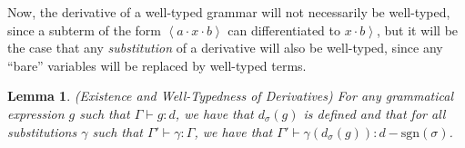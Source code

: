 \documentclass{article}
\newcommand{\lft}[1]{\left<{#1}\right.}
\newcommand{\rgt}[1]{\left.{#1}\right>}
\newcommand{\judgebalance}[3][\Gamma]{{#1} \vdash {#2} : {#3}}
\newcommand{\judgesubst}[3]{{#1} \vdash {#2} : {#3}}
\newcommand{\deriv}[2]{d_{#1}({#2})}
\newtheorem{lemma}{Lemma}
\begin{document}
Now, the derivative of a well-typed grammar will not necessarily be
well-typed, since a subterm of the form $\lft{a}\cdot x \cdot\rgt{b}$ can
differentiated to $x\cdot\rgt{b}$, but it will be the case that any
\emph{substitution} of a derivative will also be well-typed, since
any ``bare'' variables will be replaced by well-typed terms. 

\begin{lemma}{(Existence and Well-Typedness of Derivatives)}
For any grammatical expression $g$ such that $\judgebalance{g}{d}$, 
we have that $\deriv{\sigma}{g}$ is defined and that for all 
substitutions $\gamma$ such that $\judgesubst{\Gamma'}{\gamma}{\Gamma}$, 
we have that $\judgebalance[\Gamma']{\gamma(\deriv{\sigma}{g})}{d - \mathrm{sgn}(\sigma)}$.
\end{lemma}
\end{document}
